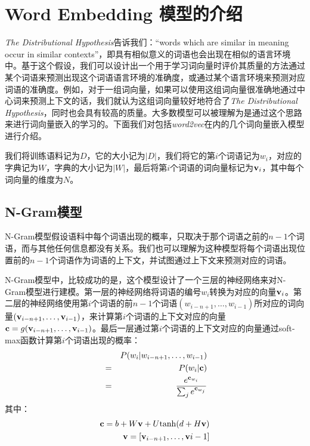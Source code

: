 \iffalse



\fi

\chapter{Word Embedding 模型的介绍}
\label{chap:w2v}

\emph{The Distributional Hypothesis}告诉我们：``words which are similar in meaning occur in similar contexts''\citep{rubenstein1965contextual}，即具有相似意义的词语也会出现在相似的语言环境中。基于这个假设，我们可以设计出一个用于学习词向量时评价其质量的方法\mydash 通过某个词语来预测出现这个词语语言环境的准确度，或通过某个语言环境来预测对应词语的准确度。例如，对于一组词向量，如果可以使用这组词向量很准确地通过中心词来预测上下文的话，我们就认为这组词向量较好地符合了\emph{The Distributional Hypothesis}，同时也会具有较高的质量。大多数模型可以被理解为是通过这个思路来进行词向量嵌入的学习的。下面我们对包括\emph{word2vec}在内的几个词向量嵌入模型进行介绍。

我们将训练语料记为$D$，它的大小记为$|D|$，我们将它的第$i$个词语记为$w_i$，对应的字典记为$W$，字典的大小记为$|W|$，最后将第$i$个词语的词向量标记为${{\mathbf v}}_i$，其中每个词向量的维度为$N$。

\section{N-Gram模型}

N-Gram模型假设语料中每个词语出现的概率，只取决于那个词语之前的$n-1$个词语，而与其他任何信息都没有关系。我们也可以理解为这种模型将每个词语出现位置前的$n-1$个词语作为词语的上下文，并试图通过上下文来预测对应的词语。

N-Gram模型中，比较成功的是\cite{bengio2006neural}，这个模型设计了一个三层的神经网络来对N-Gram模型进行建模。第一层的神经网络将词语的编号$w_i$转换为对应的向量${{\mathbf v}}_i$。第二层的神经网络使用第$i$个词语的前$n-1$个词语$(w_{i-n+1}, \dots , w_{i-1})$所对应的词向量$({{\mathbf v}}_{i-n+1}, \dots , {{\mathbf v}}_{i-1})$，来计算第$i$个词语的上下文对应的向量${{\mathbf c}} = g({{\mathbf v}}_{i-n+1}, \dots, {{\mathbf v}}_{i-1})$。最后一层通过第$i$个词语的上下文对应的向量通过soft-max函数计算第$i$个词语出现的概率：
\begin{eqnarray*}
&&P(w_i| w_{i-n+1}, \dots, w_{i-1}) \\
&=& P(w_i | {{\mathbf c}}) \\
&=& \frac{e^{{{\mathbf c}}_{w_i}}}{\sum_j e^{{{\mathbf c}}_{w_j}}}
\end{eqnarray*}
其中：
\begin{eqnarray*}
{{\mathbf c}} = b + W{{\mathbf v}} + U \mathrm{tanh}(d+H{{\mathbf v}}) \\
{{\mathbf v}} = [{{\mathbf v}}_{i-n+1}, \dots, {{\mathbf v}}{i-1}]
\end{eqnarray*}

